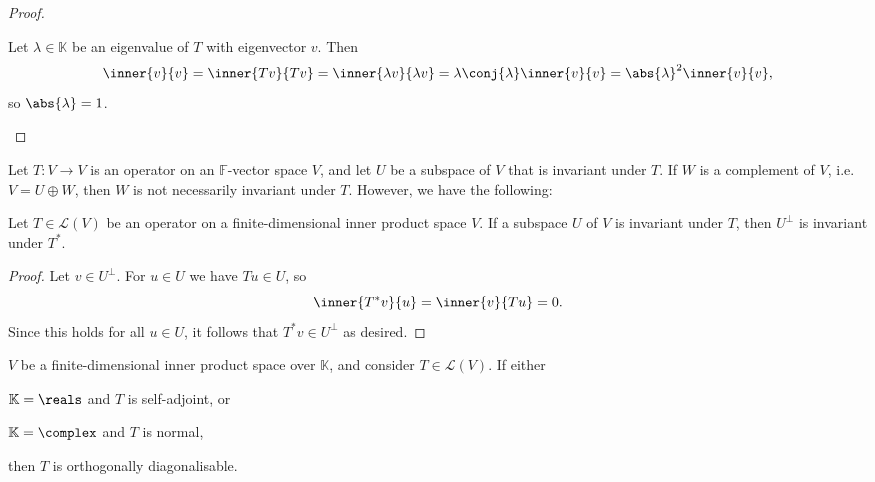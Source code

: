 \documentclass[article, a4paper, 11pt, oneside]{memoir}
\numberwithin{equation}{chapter}
\newcommand{\calL}{\mathcal{L}}
\newcommand{\calV}{\mathcal{V}}
\newcommand{\field}{\mathbb{F}}
\begin{document}
\begin{proof}
\begin{proofsec}

    \item[Proof of \subcref{enum:unitary-eigenvalues-unit-circle}]
    Let $\lambda \in \mathbb{K}$ be an eigenvalue of $T$ with eigenvector $v$. Then
    \begin{equation*}
        \inner{v}{v}
            = \inner{Tv}{Tv}
            = \inner{\lambda v}{\lambda v}
            = \lambda \conj{\lambda} \inner{v}{v}
            = \abs{\lambda}^2 \inner{v}{v},
    \end{equation*}
    so $\abs{\lambda} = 1$.
\end{proofsec}
\end{proof}


Let $T \colon V \to V$ is an operator on an $\field$-vector space $V$, and let $U$ be a subspace of $V$ that is invariant under $T$. If $W$ is a complement of $V$, i.e. $V = U \oplus W$, then $W$ is not necessarily invariant under $T$. However, we have the following:

\begin{lemma}
    \label{thm:adjoint-invariant-subspace}
    Let $T \in \calL(V)$ be an operator on a finite-dimensional inner product space $V$. If a subspace $U$ of $V$ is invariant under $T$, then $U^\perp$ is invariant under $T^*$.
\end{lemma}

\begin{proof}
    Let $v \in U^\perp$. For $u \in U$ we have $Tu \in U$, so
    \begin{equation*}
        \inner{T^*v}{u}
            = \inner{v}{Tu}
            = 0.
    \end{equation*}
    Since this holds for all $u \in U$, it follows that $T^*v \in U^\perp$ as desired.
\end{proof}

\begin{lemma}
    \label{lem:spectral-lemma}
    $V$ be a finite-dimensional inner product space over $\mathbb{K}$, and consider $T \in \calL(V)$. If either
    \begin{enumthm}
        \item $\mathbb{K} = \reals$ and $T$ is self-adjoint, or
        \item $\mathbb{K} = \complex$ and $T$ is normal,
    \end{enumthm}
    then $T$ is orthogonally diagonalisable.
\end{lemma}
\end{document}
